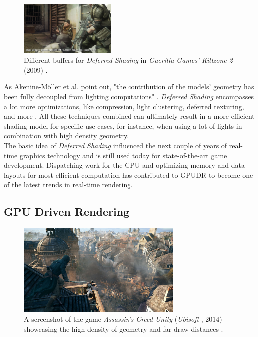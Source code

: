 \begin{figure}[!]
    \includegraphics[width=175px]{images/graphics/killzone-2-buffer-post.jpg}
    \caption{Different buffers for \emph{Deferred Shading} in \emph{Guerilla Games'} \emph{Killzone 2} (2009) 
    \cite{Valient2007}.}
    \label{fig:deferred-shading-buffers}
\end{figure}

\noindent
As Akenine-Möller et al. point out, "the contribution of the models’ geometry has been fully decoupled from lighting 
computations" \cite{AkenineMoeller2018}. \emph{Deferred Shading} encompasses a lot more optimizations, like compression, 
light clustering, deferred texturing, and more \cite{AkenineMoeller2018}. All these techniques combined can ultimately 
result in a more efficient shading model for specific use cases, for instance, when using a lot of lights in combination 
with high density geometry.\\

\noindent
The basic idea of \emph{Deferred Shading} influenced the next couple of years of real-time graphics technology and is 
still used today for state-of-the-art game development. Dispatching work for the \ac{GPU} and optimizing memory and 
data layouts for most efficient computation has contributed to \ac{GPUDR} to become one of the latest trends in real-time 
rendering.


\subsection*{GPU Driven Rendering}

\begin{figure}[h]
    \centering
    \includegraphics[width=300px]{images/graphics/assassins-creed-unity-gameplay.jpg}
    \caption{A screenshot of the game \emph{Assassin's Creed Unity} (\emph{Ubisoft} \cite{Ubisoft2014}, 2014) 
    showcasing the high density of geometry and far draw distances \cite{Burke2014}.}
    \label{fig:assassins-creed-unity-gameplay}
\end{figure}

